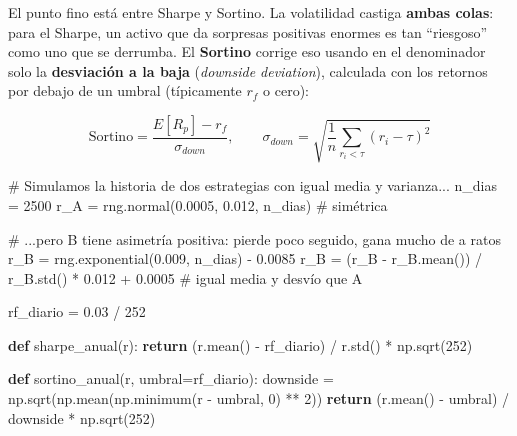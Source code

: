 \documentclass[
  spanish,
  letterpaper,
  DIV=11,
  numbers=noendperiod]{scrreprt}
\newenvironment{Shaded}{\begin{snugshade}}{\end{snugshade}}
\newcommand{\CommentTok}[1]{\textcolor[rgb]{0.37,0.37,0.37}{#1}}
\newcommand{\ControlFlowTok}[1]{\textcolor[rgb]{0.00,0.23,0.31}{\textbf{#1}}}
\newcommand{\DecValTok}[1]{\textcolor[rgb]{0.68,0.00,0.00}{#1}}
\newcommand{\FloatTok}[1]{\textcolor[rgb]{0.68,0.00,0.00}{#1}}
\newcommand{\KeywordTok}[1]{\textcolor[rgb]{0.00,0.23,0.31}{\textbf{#1}}}
\newcommand{\NormalTok}[1]{\textcolor[rgb]{0.00,0.23,0.31}{#1}}
\newcommand{\OperatorTok}[1]{\textcolor[rgb]{0.37,0.37,0.37}{#1}}
\begin{document}
El punto fino está entre Sharpe y Sortino. La volatilidad castiga
\textbf{ambas colas}: para el Sharpe, un activo que da sorpresas
positivas enormes es tan ``riesgoso'' como uno que se derrumba. El
\textbf{Sortino} corrige eso usando en el denominador solo la
\textbf{desviación a la baja} (\emph{downside deviation}), calculada con
los retornos por debajo de un umbral (típicamente \(r_f\) o cero):

\[\text{Sortino} = \frac{E[R_p] - r_f}{\sigma_{down}}, \qquad \sigma_{down} = \sqrt{\frac{1}{n}\sum_{r_i < \tau} (r_i - \tau)^2}\]

\label{sortino}
\begin{Shaded}
\begin{Highlighting}[]
\CommentTok{\# Simulamos la historia de dos estrategias con igual media y varianza...}
\NormalTok{n\_dias }\OperatorTok{=} \DecValTok{2500}
\NormalTok{r\_A }\OperatorTok{=}\NormalTok{ rng.normal(}\FloatTok{0.0005}\NormalTok{, }\FloatTok{0.012}\NormalTok{, n\_dias)                    }\CommentTok{\# simétrica}

\CommentTok{\# ...pero B tiene asimetría positiva: pierde poco seguido, gana mucho de a ratos}
\NormalTok{r\_B }\OperatorTok{=}\NormalTok{ rng.exponential(}\FloatTok{0.009}\NormalTok{, n\_dias) }\OperatorTok{{-}} \FloatTok{0.0085}
\NormalTok{r\_B }\OperatorTok{=}\NormalTok{ (r\_B }\OperatorTok{{-}}\NormalTok{ r\_B.mean()) }\OperatorTok{/}\NormalTok{ r\_B.std() }\OperatorTok{*} \FloatTok{0.012} \OperatorTok{+} \FloatTok{0.0005}      \CommentTok{\# igual media y desvío que A}

\NormalTok{rf\_diario }\OperatorTok{=} \FloatTok{0.03} \OperatorTok{/} \DecValTok{252}

\KeywordTok{def}\NormalTok{ sharpe\_anual(r):}
    \ControlFlowTok{return}\NormalTok{ (r.mean() }\OperatorTok{{-}}\NormalTok{ rf\_diario) }\OperatorTok{/}\NormalTok{ r.std() }\OperatorTok{*}\NormalTok{ np.sqrt(}\DecValTok{252}\NormalTok{)}

\KeywordTok{def}\NormalTok{ sortino\_anual(r, umbral}\OperatorTok{=}\NormalTok{rf\_diario):}
\NormalTok{    downside }\OperatorTok{=}\NormalTok{ np.sqrt(np.mean(np.minimum(r }\OperatorTok{{-}}\NormalTok{ umbral, }\DecValTok{0}\NormalTok{) }\OperatorTok{**} \DecValTok{2}\NormalTok{))}
    \ControlFlowTok{return}\NormalTok{ (r.mean() }\OperatorTok{{-}}\NormalTok{ umbral) }\OperatorTok{/}\NormalTok{ downside }\OperatorTok{*}\NormalTok{ np.sqrt(}\DecValTok{252}\NormalTok{)}


\end{Highlighting}
\end{Shaded}
\end{document}
